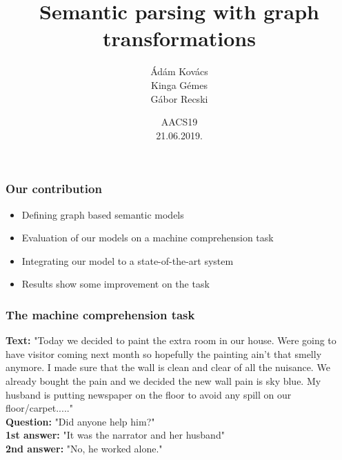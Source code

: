 \documentclass[bigger]{beamer}
\begin{document}
\title{Semantic parsing with graph transformations}
\author{\'Ad\'am Kov\'acs \\ Kinga G\'emes \\ G\'abor Recski}

\date{AACS19\\21.06.2019.}


\begin{frame} 

\titlepage 

\end{frame} 


\begin{frame} 

    \frametitle{Our contribution} 
    \begin{itemize}
        \pause \item Defining graph based semantic models
        \pause \item Evaluation of our models on a machine comprehension task
        \pause \item Integrating our model to a state-of-the-art system
        \pause \item Results show some improvement on the task
    \end{itemize}

\end{frame} 

\begin{frame}
	\frametitle{The machine comprehension task \citep{Chen:2018, Wang:2018}}
	\textbf{Text:} "Today we decided to paint the extra room in our house. Were going to have visitor coming next month so hopefully the painting ain't that smelly anymore. I made sure that the wall is clean and clear of all the nuisance. We already bought the pain and we decided the new wall pain is sky blue. My husband is putting newspaper on the floor to avoid any spill on our floor/carpet....." \\
	\textbf{Question:} "Did anyone help him?" \\
	\textbf{1st answer:} "It was the narrator and her husband" \\
	\textbf{2nd answer:} "No, he worked alone."
\end{frame}

\end{document}
